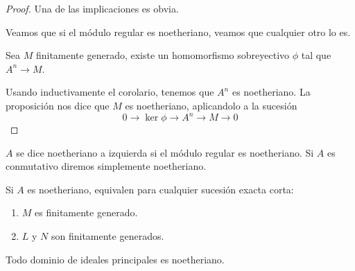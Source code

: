 \begin{proof}
  Una de las implicaciones es obvia.

  Veamos que si el módulo regular es noetheriano, veamos que cualquier otro
  lo es.

  Sea \(M\) finitamente generado, existe un homomorfismo sobreyectivo \(\phi\)
  tal que \(A^n\longrightarrow M\).

  Usando inductivamente el corolario, tenemos que \(A^n\) es noetheriano.
  La proposición nos dice que \(M\) es noetheriano, aplicandolo
  a la sucesión
  \[
    0\longrightarrow\ker\phi\longrightarrow A^n\longrightarrow
    M\longrightarrow 0
  \]
\end{proof}

\begin{df}
  \(A\) se dice noetheriano a izquierda si el módulo regular es
  noetheriano. Si \(A\) es conmutativo diremos simplemente noetheriano.
\end{df}

\begin{cor}
  Si \(A\) es noetheriano, equivalen para cualquier sucesión exacta corta:
  \begin{enumerate}
    \item \(M\) es finitamente generado.
    \item \(L\) y \(N\) son finitamente generados.
  \end{enumerate}
\end{cor}

\begin{cor}
  Todo dominio de ideales principales es noetheriano.
\end{cor}
